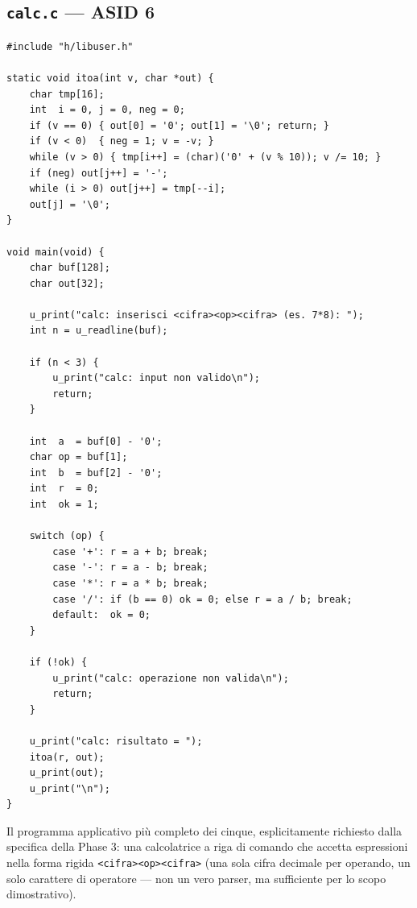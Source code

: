 \documentclass[11pt,a4paper]{article}
\newcommand{\code}[1]{\texttt{#1}}
\begin{document}
\subsection{\code{calc.c} --- ASID 6}
\begin{lstlisting}
#include "h/libuser.h"

static void itoa(int v, char *out) {
    char tmp[16];
    int  i = 0, j = 0, neg = 0;
    if (v == 0) { out[0] = '0'; out[1] = '\0'; return; }
    if (v < 0)  { neg = 1; v = -v; }
    while (v > 0) { tmp[i++] = (char)('0' + (v % 10)); v /= 10; }
    if (neg) out[j++] = '-';
    while (i > 0) out[j++] = tmp[--i];
    out[j] = '\0';
}

void main(void) {
    char buf[128];
    char out[32];

    u_print("calc: inserisci <cifra><op><cifra> (es. 7*8): ");
    int n = u_readline(buf);

    if (n < 3) {
        u_print("calc: input non valido\n");
        return;
    }

    int  a  = buf[0] - '0';
    char op = buf[1];
    int  b  = buf[2] - '0';
    int  r  = 0;
    int  ok = 1;

    switch (op) {
        case '+': r = a + b; break;
        case '-': r = a - b; break;
        case '*': r = a * b; break;
        case '/': if (b == 0) ok = 0; else r = a / b; break;
        default:  ok = 0;
    }

    if (!ok) {
        u_print("calc: operazione non valida\n");
        return;
    }

    u_print("calc: risultato = ");
    itoa(r, out);
    u_print(out);
    u_print("\n");
}
\end{lstlisting}
Il programma applicativo più completo dei cinque, esplicitamente richiesto
dalla specifica della Phase 3: una calcolatrice a riga di comando che
accetta espressioni nella forma rigida \code{<cifra><op><cifra>} (una sola
cifra decimale per operando, un solo carattere di operatore --- non un vero
parser, ma sufficiente per lo scopo dimostrativo).
\end{document}
